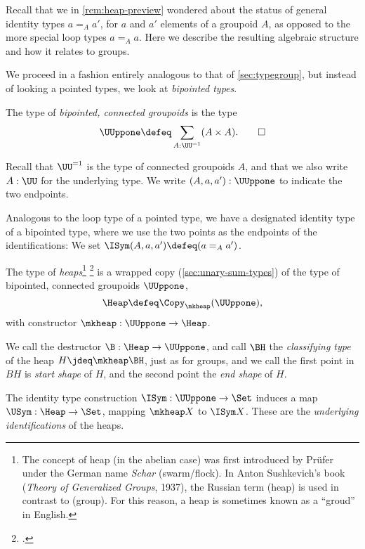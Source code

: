 Recall that we in \cref{rem:heap-preview} wondered about
the status of general identity types $a=_A a'$,
for $a$ and $a'$ elements of a groupoid $A$,
as opposed to the more special loop types $a=_Aa$.
Here we describe the resulting algebraic structure
and how it relates to groups.

We proceed in a fashion entirely analogous to that of \cref{sec:typegroup},
but instead of looking a pointed types, we look at \emph{bipointed types}.

\begin{definition}\label{def:bipt-conn-groupoid}
  The type of \emph{bipointed, connected groupoids} is the type
  \[
    \UUppone \defeq \sum_{A:\UU^{=1}}(A \times A).\qedhere
  \]
\end{definition}
Recall that $\UU^{=1}$ is the type of connected groupoids $A$,
and that we also write $A:\UU$ for the underlying type.
We write $(A,a,a'):\UUppone$ to indicate the two endpoints.

Analogous to the loop type of a pointed type,
we have a designated identity type of a bipointed type,
where we use the two points as the endpoints of the identifications:
We set $\ISym(A,a,a') \defeq (a =_A a')$.

\begin{definition}\label{def:heap}
  The type of \emph{heaps}\footnote{%
    The concept of heap (in the abelian case)
    was first introduced by Prüfer\footnotemark{}
    under the German name \emph{Schar} (swarm/flock).
    In Anton Sushkevich's book
    (\emph{Theory of Generalized Groups}, 1937),
    the Russian term  (heap)
    is used in contrast to  (group).
    For this reason, a heap is sometimes
    known as a ``groud'' in English.}%
  \footcitetext{Pruefer-AG}
  is a wrapped copy (\cf \cref{sec:unary-sum-types})
  of the type of bipointed, connected groupoids $\UUppone$,
  \[
    \Heap \defeq \Copy_{\mkheap}(\UUppone),
  \]
  with constructor $\mkheap : \UUppone \to \Heap$.
\end{definition}
We call the destructor $\B : \Heap \to \UUppone$,
and call $\BH$ the \emph{classifying type} of the heap $H \jdeq\mkheap\BH$,
just as for groups,
and we call the first point in $BH$ is \emph{start shape} of $H$,
and the second point the \emph{end shape} of $H$.

The identity type construction $\ISym : \UUppone \to \Set$
induces a map $\USym : \Heap \to \Set$,
mapping $\mkheap X$ to $\ISym X$.
These are the \emph{underlying identifications} of the heaps.

